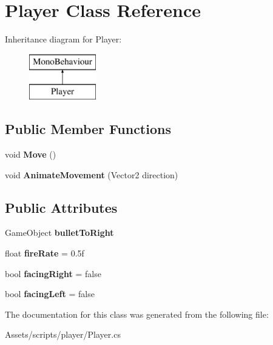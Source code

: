 \hypertarget{class_player}{}\section{Player Class Reference}
\label{class_player}
Inheritance diagram for Player\+:\begin{figure}[H]
\begin{center}
\leavevmode
\includegraphics[height=2.000000cm]{class_player}
\end{center}
\end{figure}
\subsection*{Public Member Functions}
\begin{DoxyCompactItemize}
\item 
\mbox{\label{class_player_a3fdebad803b97f4643696b3421be2195}} 
void {\bfseries Move} ()
\item 
\mbox{\label{class_player_aa716aeae25769b5670f983dda76932ee}} 
void {\bfseries Animate\+Movement} (Vector2 direction)
\end{DoxyCompactItemize}
\subsection*{Public Attributes}
\begin{DoxyCompactItemize}
\item 
\mbox{\label{class_player_a3224d616922f25bff5c19a70a5cee0e6}} 
Game\+Object {\bfseries bullet\+To\+Right}
\item 
\mbox{\label{class_player_ad5f622aa9edaddd5838cbdce5ba76c62}} 
float {\bfseries fire\+Rate} = 0.\+5f
\item 
\mbox{\label{class_player_af4852258f51f1596ed16923ba6613c10}} 
bool {\bfseries facing\+Right} = false
\item 
\mbox{\label{class_player_a8d784e01bdbbb7cca9d8b88cdb9815d3}} 
bool {\bfseries facing\+Left} = false
\end{DoxyCompactItemize}


The documentation for this class was generated from the following file\+:\begin{DoxyCompactItemize}
\item 
Assets/scripts/player/Player.\+cs\end{DoxyCompactItemize}
